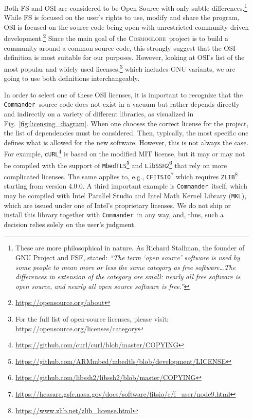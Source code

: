 \documentclass[twocolumn]{openjournal}
\def\commander{\texttt{Commander}}
\newcommand{\cosmoglobe}{\textsc{Cosmoglobe}}
\begin{document}
Both FS and OSI are considered to be Open Source with only subtle
differences.\footnote{These are more philosophical in nature. As
  Richard Stallman, the founder of GNU Project and FSF, stated: \textit{``The
  term `open source' software is used by some people to mean more or
  less the same category as free software\ldots The differences in
  extension of the category are small: nearly all free software is
  open source, and nearly all open source software is free.''}} While FS
is focused on the user's rights to use, modify and share the program,
OSI is focused on the source code being open with unrestricted
community driven
development.\footnote{\url{https://opensource.org/about}} Since the main
goal of the \cosmoglobe\ project is to build a community around a
common source code, this strongly suggest that the OSI definition is
most suitable for our purposes. However, looking at OSI's list of
the most popular and widely used licenses,\footnote{For the full list
  of open-source licenses, please visit:
  \newline
  \url{https://opensource.org/licenses/category}}
which includes GNU variants, we are going to use both definitions
interchangeably. 

In order to select one of these OSI licenses, it is important to recognize that
the \commander\ source code does not exist in a vacuum but rather depends
directly and indirectly on a variety of different libraries, as visualized in
Fig.~\ref{fig:licensing_diagram}. When one chooses the correct license for the
project, the list of dependencies must be considered. Then, typically, the most
specific one defines what is allowed for the new software. However, this is not
always the case. For example, \texttt{cURL}\footnote{
  \url{https://github.com/curl/curl/blob/master/COPYING}} is based on the
modified MIT license, but it may or may not be compiled with the support of
\texttt{MbedTLS}\footnote{
  \url{https://github.com/ARMmbed/mbedtls/blob/development/LICENSE}}
and \texttt{LibSSH2}\footnote{
  \url{https://github.com/libssh2/libssh2/blob/master/COPYING}} that
rely on more complicated licenses. The same applies to, e.g.,
\texttt{CFITSIO}\footnote{\url{https://heasarc.gsfc.nasa.gov/docs/software/fitsio/c/f_user/node9.html}}
which requires
\texttt{ZLIB}\footnote{\url{https://www.zlib.net/zlib_license.html}} starting
from version 4.0.0. A third important example is \commander\ itself, which may
be compiled with Intel Parallel Studio and Intel Math Kernel Library
(\texttt{MKL}), which are issued under one of Intel's proprietary licenses. We
do not ship or install this library together with \commander\ in any way, and,
thus, such a decision relies solely on the user's judgment.
\end{document}
